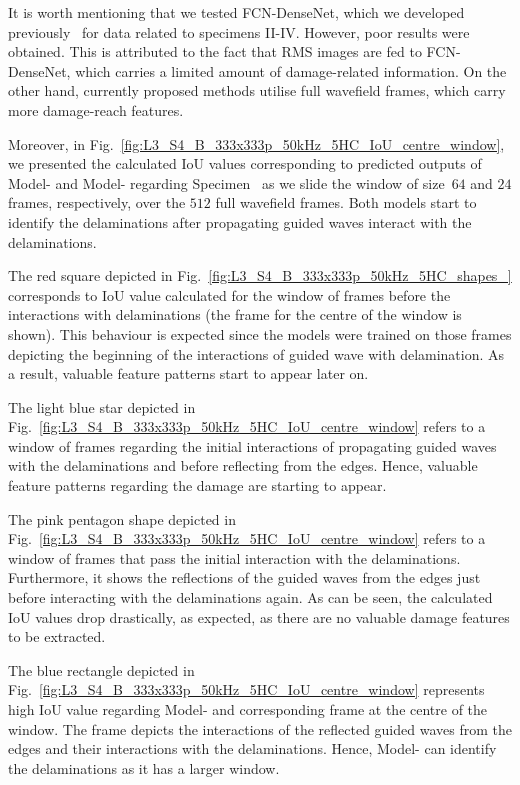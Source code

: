 \begin{sloppypar}
	It is worth mentioning that we tested FCN-DenseNet, which we developed previously~\cite{Ijjeh2021} for data related to specimens II-IV. 
	However, poor results were obtained. 
	This is attributed to the fact that RMS images are fed to FCN-DenseNet, which carries a limited amount of damage-related information. 
	On the other hand, currently proposed methods utilise full wavefield frames, which carry more damage-reach features. 
	
	Moreover, in Fig.~\ref{fig:L3_S4_B_333x333p_50kHz_5HC_IoU_centre_window}, we presented the calculated IoU values corresponding to predicted outputs of Model- and Model- regarding Specimen~ as we slide the window of size~\(64\) and \(24\) frames, respectively, over the \(512\) full wavefield frames.
	Both models start to identify the delaminations after propagating guided waves interact with the delaminations.
	
	The red square depicted in Fig.~\ref{fig:L3_S4_B_333x333p_50kHz_5HC_shapes_} corresponds to IoU value calculated for the window of frames before the interactions with delaminations (the frame for the centre of the window is shown).
	This behaviour is expected since the models were trained on those frames depicting the beginning of the interactions of guided wave with delamination. 
	As a result, valuable feature patterns start to appear later on.
	
	The light blue star depicted in Fig.~\ref{fig:L3_S4_B_333x333p_50kHz_5HC_IoU_centre_window} refers to a window of frames regarding the initial interactions of propagating guided waves with the delaminations and before reflecting from the edges.
	Hence, valuable feature patterns regarding the damage are starting to appear.
	
	The pink pentagon shape depicted in Fig.~\ref{fig:L3_S4_B_333x333p_50kHz_5HC_IoU_centre_window} refers to a window of frames that pass the initial interaction with the delaminations. 
	Furthermore, it shows the reflections of the guided waves from the edges just before interacting with the delaminations again.
	As can be seen, the calculated IoU values drop drastically, as expected, as there are no valuable damage features to be extracted.  
	
	The blue rectangle depicted in Fig.~\ref{fig:L3_S4_B_333x333p_50kHz_5HC_IoU_centre_window} represents high IoU value regarding Model- and corresponding frame at the centre of the window.
	The frame depicts the interactions of the reflected guided waves from the edges and their interactions with the delaminations. 
	Hence, Model- can identify the delaminations as it has a larger window.
	

\end{sloppypar}
